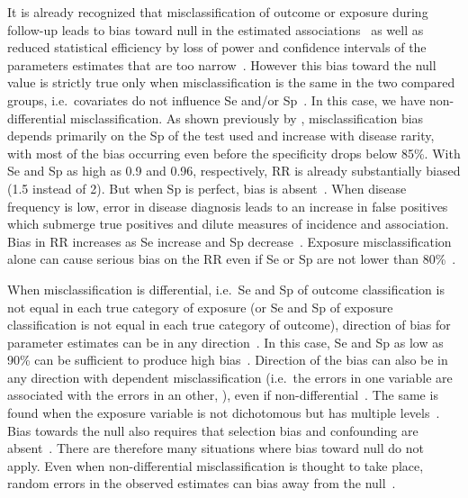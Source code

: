 It is already recognized that misclassification of outcome or exposure during
follow-up leads to bias toward null in the estimated
associations~\citep{Bross1954,Copeland1977,FLEGAL_1986} as well as reduced
statistical efficiency by loss of power\citep{WHITE_1986} and confidence
intervals of the parameters estimates that are too narrow~\citep{Neuhaus_1999}.
However this bias toward the null value is strictly true only when
misclassification is the same in the two compared groups, i.e.\ covariates do
not influence Se and/or Sp~\citep{Copeland1977,Sorahan_1994,Neuhaus_1999}.
In this case, we have non-differential misclassification.
As shown previously by \cite{Copeland1977}, misclassification bias depends
primarily on the Sp of the test used and increase with disease rarity, with most
of the bias occurring even before the specificity drops below 85\%.
With Se and Sp as high as 0.9 and 0.96, respectively, RR is already
substantially biased (1.5 instead of 2).
But when Sp is perfect, bias is absent~\citep{Poole1985}.
When disease frequency is low, error in disease diagnosis leads to an increase
in false positives which submerge true positives and dilute measures of
incidence and association.
Bias in RR increases as Se increase and Sp decrease~\citep{WHITE_1986}.
Exposure misclassification alone can cause serious bias on the RR even if Se or
Sp are not lower than 80\%~\citep{Kristensen_1992}.

When misclassification is differential, i.e.\ Se and Sp of outcome
classification is not equal in each true category of exposure (or Se and Sp of
exposure classification is not equal in each true category of outcome),
direction of bias for parameter estimates can be in any
direction~\citep{Dosemeci_1990,Neuhaus_1999,Chen_2013}.
In this case, Se and Sp as low as 90\% can be sufficient to produce high
bias~\citep{Kristensen_1992}.
Direction of the bias can also be in any direction with dependent
misclassification (i.e.\ the errors in one variable are associated with the
errors in an other, \citealp{Assakul_1967,Greenland_1989}), even if
non-differential~\citep{Kristensen_1992}.
The same is found when the exposure variable is not dichotomous but has multiple
levels~\citep{Dosemeci_1990,Weinberg_1994}.
Bias towards the null also requires that selection bias and confounding are
absent~\citep{Jurek_2004}.
There are therefore many situations where bias toward null do not apply.
Even when non-differential misclassification is thought to take place, random
errors in the observed estimates can bias away from the null~\citep{Jurek_2004}.

